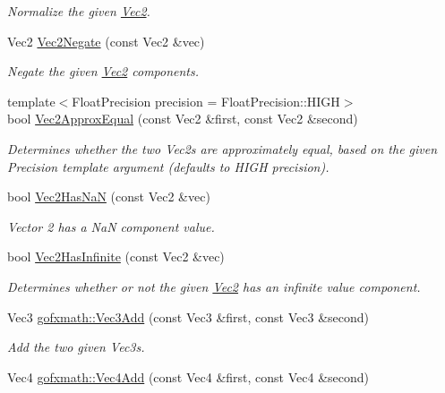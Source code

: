 \begin{DoxyCompactItemize}
\begin{DoxyCompactList}\small\item\em Normalize the given \hyperlink{classgofxmath_1_1_vec2}{Vec2}. \end{DoxyCompactList}\item 
Vec2 \hyperlink{group___s_i_s_d_vec_math_ga55959c707ef1b444eb2d71009a201aa2}{Vec2\+Negate} (const Vec2 \&vec)
\begin{DoxyCompactList}\small\item\em Negate the given \hyperlink{classgofxmath_1_1_vec2}{Vec2} components. \end{DoxyCompactList}\item 
{\footnotesize template$<$Float\+Precision precision = Float\+Precision\+::\+H\+I\+G\+H$>$ }\\bool \hyperlink{group___s_i_s_d_vec_math_gae2e5df24e56917013fefa17579bb8749}{Vec2\+Approx\+Equal} (const Vec2 \&first, const Vec2 \&second)
\begin{DoxyCompactList}\small\item\em Determines whether the two Vec2s are approximately equal, based on the given Precision template argument (defaults to H\+I\+G\+H precision). \end{DoxyCompactList}\item 
bool \hyperlink{group___s_i_s_d_vec_math_ga7b340b1e4dd88d99aba27f41cd0c1d17}{Vec2\+Has\+Na\+N} (const Vec2 \&vec)
\begin{DoxyCompactList}\small\item\em Vector 2 has a Na\+N component value. \end{DoxyCompactList}\item 
bool \hyperlink{group___s_i_s_d_vec_math_ga6eb96a6532361189c7cacdbd9ae95c90}{Vec2\+Has\+Infinite} (const Vec2 \&vec)
\begin{DoxyCompactList}\small\item\em Determines whether or not the given \hyperlink{classgofxmath_1_1_vec2}{Vec2} has an infinite value component. \end{DoxyCompactList}\item 
Vec3 \hyperlink{group___s_i_s_d_vec_math_gac3979900225f137a1486a4491d0fb6d8}{gofxmath\+::\+Vec3\+Add} (const Vec3 \&first, const Vec3 \&second)
\begin{DoxyCompactList}\small\item\em Add the two given Vec3s. \end{DoxyCompactList}\item 
Vec4 \hyperlink{group___s_i_s_d_vec_math_ga8812efd4565ada77e6dab63828ad715b}{gofxmath\+::\+Vec4\+Add} (const Vec4 \&first, const Vec4 \&second)

\end{DoxyCompactItemize}
